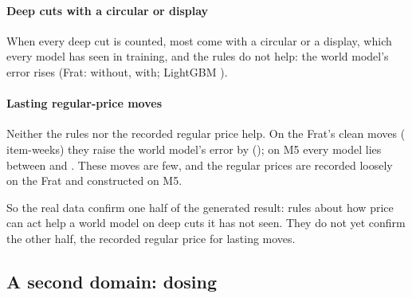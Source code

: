 \paragraph{Deep cuts with a circular or display} When every deep cut is counted, most come with a circular or a
display, which every model has seen in training, and the rules do not help: the world model's error rises (Frat:
\reFDeepWm{} without, \reFDeepWmShape{} with; LightGBM \reFDeepLgb{}).

\paragraph{Lasting regular-price moves} Neither the rules nor the recorded regular price help. On the Frat's clean
moves (\rnFMove{} item-weeks) they raise the world model's error by \rpFMoveWmShapeVWm{}
(\rpFMoveWmShapeVWmCi{}); on M5 every model lies between \reMMoveLl{} and \reMMoveWm{}. These moves are few, and the
regular prices are recorded loosely on the Frat and constructed on M5.

So the real data confirm one half of the generated result: rules about how price can act help a world model on deep
cuts it has not seen. They do not yet confirm the other half, the recorded regular price for lasting moves.



\subsection{A second domain: dosing}

